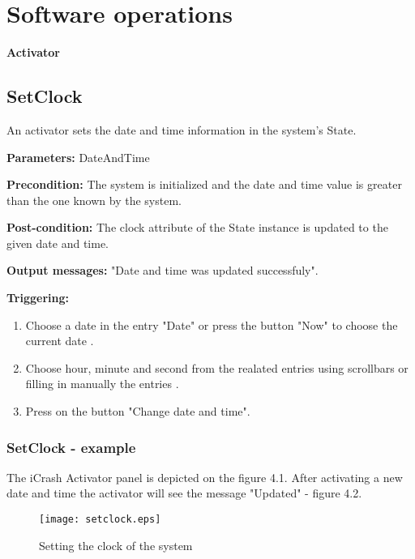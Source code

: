 \chapter{Software operations}
\label{chap:soptware_operations}

\begin{center}
	{\bf \Large Activator}
\end{center}

\section{SetClock}
\label{operation:CloseCrisis}
An activator sets the date and time information in the system's State.
\begin{description}
	\item \textbf{Parameters:} DateAndTime
	\item \textbf{Precondition:} The system is initialized and the date and time
	value is greater than the one known by the system.
	\item \textbf{Post-condition:} The clock attribute of the State instance is
	updated to the given date and time.
	\item \textbf{Output messages:} "Date and time was updated
	successfuly".
	
	\item \textbf{Triggering:}
	
	\begin{enumerate}
		\item Choose a date in the entry "Date" or press the button "Now" to choose
		the current date .
		\item Choose hour, minute and second from the realated entries using
		scrollbars or filling in manually the entries .
		\item Press on the button "Change date and time".
	\end{enumerate}
\end{description}

\subsection{SetClock - example}

The iCrash Activator panel is depicted on the figure 4.1. After activating a new
date and time the activator will see the message "Updated" - figure 4.2. 

\begin{figure}[h]
    \texttt{[image: setclock.eps]}
	\caption{Setting the clock of the system}
\end{figure}

